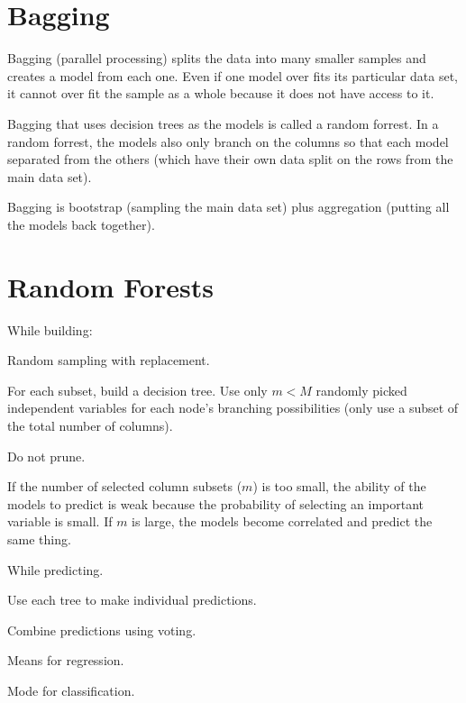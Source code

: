 	\section{Bagging}
Bagging (parallel processing) splits the data into many smaller samples and creates a model from each one.  Even if one model over fits its particular data set, it cannot over fit the sample as a whole because it does not have access to it.

Bagging that uses decision trees as the models is called a random forrest.  In a random forrest, the models also only branch on the columns so that each model separated from the others (which have their own data split on the rows from the main data set).

Bagging is bootstrap (sampling the main data set) plus aggregation (putting all the models back together).

	\section{Random Forests}
While building:
	\begin{bulletedlist}
		\item Random sampling with replacement.
		\item For each subset, build a decision tree.  Use only $m<M$ randomly picked independent variables for each node's branching possibilities (only use a subset of the total number of columns).
		\item Do not prune.
	\end{bulletedlist}
If the number of selected column subsets ($m$) is too small, the ability of the models to predict is weak because the probability of selecting an important variable is small.  If $m$ is large, the models become correlated and predict the same thing.

While predicting.
	\begin{bulletedlist}
		\item Use each tree to make individual predictions.
		\item Combine predictions using voting.
		\begin{bulletedlist}
			\item Means for regression.
			\item Mode for classification.
		\end{bulletedlist}
	\end{bulletedlist}


